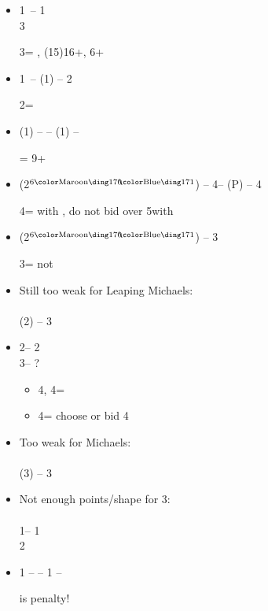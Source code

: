 \documentclass[12pt, a4paper]{article}
\begin{document}
\begin{itemize}

\item
1\clubs\ -- 1\hearts \\ 3\clubs 

3\clubs = \inv, (15)16+, 6+\clubs

\item
1\diams\ -- (1\spades) -- 2\spades 

2\spades = \fton{3\diams}

\item
(1\hearts) -- \dbl -- (1\nt) -- \dbl 

\dbl = 9+

\item 
(2\diams$^\text{6\major}$) -- 4\clubs -- (P) -- 4\spades

4\spades = \pass with \spades, do not bid over 5\clubs with \hearts

\item
(2\diams$^\text{6\major}$) -- 3\nt

3\nt = not \gf

\item Still too weak for Leaping Michaels: \\
\\
(2\spades) -- 3\spades

\item 2\clubs -- 2\hearts \\ 3\nt -- ?

\begin{itemize}
\item 4\diams, 4\hearts = \trsf{\hearts/\spades}
\item 4\clubs = choose \major or bid 4\nt \nat
\end{itemize}

\item Too weak for Michaels: \\
\\
(3\hearts) -- 3\spades

\item Not enough points/shape for 3\spades:\\
 \\
1\clubs -- 1\spades \\
2\spades

\item 1 -- \dbl -- 1 -- \dbl 

\dbl is penalty!


\end{itemize}
\end{document}
